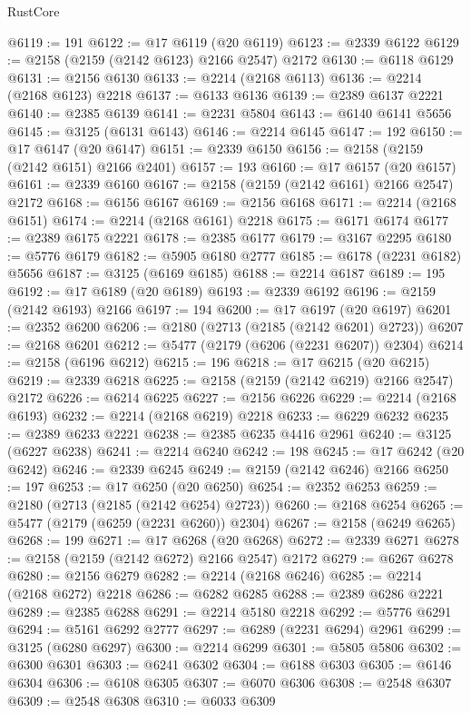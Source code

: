 \begin{lexlean}{RustCore}
\begin{coremodule}
@6119 := 191
@6122 := @17 @6119 (@20 @6119)
@6123 := @2339 @6122
@6129 := @2158 (@2159 (@2142 @6123) @2166 @2547) @2172
@6130 := @6118 @6129
@6131 := @2156 @6130
@6133 := @2214 (@2168 @6113)
@6136 := @2214 (@2168 @6123) @2218
@6137 := @6133 @6136
@6139 := @2389 @6137 @2221
@6140 := @2385 @6139
@6141 := @2231 @5804
@6143 := @6140 @6141 @5656
@6145 := @3125 (@6131 @6143)
@6146 := @2214 @6145
@6147 := 192
@6150 := @17 @6147 (@20 @6147)
@6151 := @2339 @6150
@6156 := @2158 (@2159 (@2142 @6151) @2166 @2401)
@6157 := 193
@6160 := @17 @6157 (@20 @6157)
@6161 := @2339 @6160
@6167 := @2158 (@2159 (@2142 @6161) @2166 @2547) @2172
@6168 := @6156 @6167
@6169 := @2156 @6168
@6171 := @2214 (@2168 @6151)
@6174 := @2214 (@2168 @6161) @2218
@6175 := @6171 @6174
@6177 := @2389 @6175 @2221
@6178 := @2385 @6177
@6179 := @3167 @2295
@6180 := @5776 @6179
@6182 := @5905 @6180 @2777
@6185 := @6178 (@2231 @6182) @5656
@6187 := @3125 (@6169 @6185)
@6188 := @2214 @6187
@6189 := 195
@6192 := @17 @6189 (@20 @6189)
@6193 := @2339 @6192
@6196 := @2159 (@2142 @6193) @2166
@6197 := 194
@6200 := @17 @6197 (@20 @6197)
@6201 := @2352 @6200
@6206 := @2180 (@2713 (@2185 (@2142 @6201) @2723))
@6207 := @2168 @6201
@6212 := @5477 (@2179 (@6206 (@2231 @6207)) @2304)
@6214 := @2158 (@6196 @6212)
@6215 := 196
@6218 := @17 @6215 (@20 @6215)
@6219 := @2339 @6218
@6225 := @2158 (@2159 (@2142 @6219) @2166 @2547) @2172
@6226 := @6214 @6225
@6227 := @2156 @6226
@6229 := @2214 (@2168 @6193)
@6232 := @2214 (@2168 @6219) @2218
@6233 := @6229 @6232
@6235 := @2389 @6233 @2221
@6238 := @2385 @6235 @4416 @2961
@6240 := @3125 (@6227 @6238)
@6241 := @2214 @6240
@6242 := 198
@6245 := @17 @6242 (@20 @6242)
@6246 := @2339 @6245
@6249 := @2159 (@2142 @6246) @2166
@6250 := 197
@6253 := @17 @6250 (@20 @6250)
@6254 := @2352 @6253
@6259 := @2180 (@2713 (@2185 (@2142 @6254) @2723))
@6260 := @2168 @6254
@6265 := @5477 (@2179 (@6259 (@2231 @6260)) @2304)
@6267 := @2158 (@6249 @6265)
@6268 := 199
@6271 := @17 @6268 (@20 @6268)
@6272 := @2339 @6271
@6278 := @2158 (@2159 (@2142 @6272) @2166 @2547) @2172
@6279 := @6267 @6278
@6280 := @2156 @6279
@6282 := @2214 (@2168 @6246)
@6285 := @2214 (@2168 @6272) @2218
@6286 := @6282 @6285
@6288 := @2389 @6286 @2221
@6289 := @2385 @6288
@6291 := @2214 @5180 @2218
@6292 := @5776 @6291
@6294 := @5161 @6292 @2777
@6297 := @6289 (@2231 @6294) @2961
@6299 := @3125 (@6280 @6297)
@6300 := @2214 @6299
@6301 := @5805 @5806
@6302 := @6300 @6301
@6303 := @6241 @6302
@6304 := @6188 @6303
@6305 := @6146 @6304
@6306 := @6108 @6305
@6307 := @6070 @6306
@6308 := @2548 @6307
@6309 := @2548 @6308
@6310 := @6033 @6309

\end{coremodule}
\end{lexlean}
